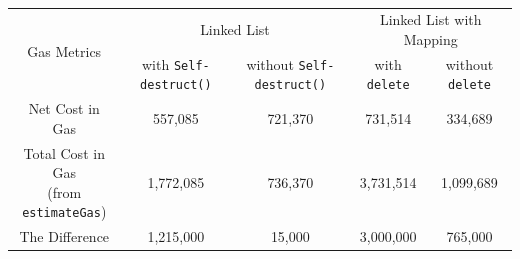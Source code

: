 \begin{table}[]
\begin{tabular}{|c|c|c|c|c|}
\hline
\multirow{2}{*}{Gas Metrics}                        							& \multicolumn{2}{c|}{Linked List}           						& \multicolumn{2}{c|}{Linked List with Mapping}     					\\ \cline{2-5} 
                                                                						& with \texttt{Self-destruct()} 		& without \texttt{Self-destruct()}                	& with \texttt{delete} 		& without \texttt{delete}              		\\ \hline                                                                                                                                                                                                                                                          %
                   Net Cost in Gas                          					& 557,085                    			& 721,370                     				& 731,514                     	& 334,689                      				\\ \hline
\thead{Total Cost in Gas \\ (from \texttt{estimateGas})} 		& 1,772,085                  			& 736,370                  					& 3,731,514                     	& 1,099,689                       				\\ \hline
		    The Difference                                             		& 1,215,000                  			& 15,000                      				& 3,000,000                    	& 765,000                       				\\ \hline

\end{tabular}
\caption{\footnotesize{}
\label{tab:LLvsLLMapping}}
\end{table}


